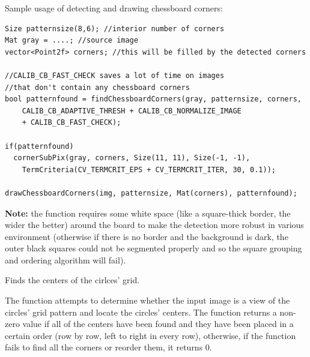 Sample usage of detecting and drawing chessboard corners:
\begin{lstlisting}
Size patternsize(8,6); //interior number of corners
Mat gray = ....; //source image
vector<Point2f> corners; //this will be filled by the detected corners

//CALIB_CB_FAST_CHECK saves a lot of time on images 
//that don't contain any chessboard corners
bool patternfound = findChessboardCorners(gray, patternsize, corners, 
	CALIB_CB_ADAPTIVE_THRESH + CALIB_CB_NORMALIZE_IMAGE 
	+ CALIB_CB_FAST_CHECK);

if(patternfound)
  cornerSubPix(gray, corners, Size(11, 11), Size(-1, -1), 
    TermCriteria(CV_TERMCRIT_EPS + CV_TERMCRIT_ITER, 30, 0.1));
    
drawChessboardCorners(img, patternsize, Mat(corners), patternfound);
\end{lstlisting}

\textbf{Note:} the function requires some white space (like a square-thick border, the wider the better) around the board to make the detection more robust in various environment (otherwise if there is no border and the background is dark, the outer black squares could not be segmented properly and so the square grouping and ordering algorithm will fail).

\ifCpp
{}
Finds the centers of the cirlces' grid.
\begin{description}
\end{description}

The function attempts to determine
whether the input image is a view of the circles' grid pattern and
locate the circles' centers. The function returns a
non-zero value if all of the centers have been found and they have been placed
in a certain order (row by row, left to right in every row),
otherwise, if the function fails to find all the corners or reorder
them, it returns 0.

